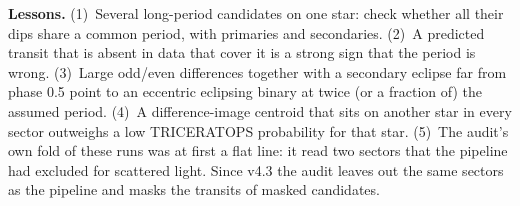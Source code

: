\begin{tip}
\textbf{Lessons.}
(1)~Several long-period candidates on one star: check whether all their
dips share a common period, with primaries and secondaries.
(2)~A predicted transit that is absent in data that cover it is a strong
sign that the period is wrong.
(3)~Large odd/even differences together with a secondary eclipse far from
phase 0.5 point to an eccentric eclipsing binary at twice (or a fraction
of) the assumed period.
(4)~A difference-image centroid that sits on another star in every sector
outweighs a low TRICERATOPS probability for that star.
(5)~The audit's own fold of these runs was at first a flat line: it read
two sectors that the pipeline had excluded for scattered light. Since
v4.3 the audit leaves out the same sectors as the pipeline and masks the
transits of masked candidates.
\end{tip}

